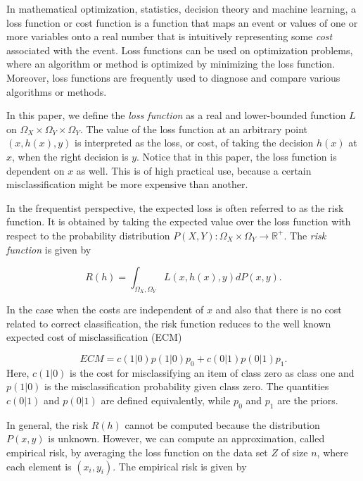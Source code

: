 In mathematical optimization, statistics, decision theory and machine learning, a loss function or cost function is a function that maps an event or values of one or more variables onto a real number that is intuitively representing some \emph{cost} associated with the event. Loss functions can be used on optimization problems, where an algorithm or method is optimized by minimizing the loss function.  Moreover, loss functions are frequently used to diagnose and compare various algorithms or methods.  

In this paper, we define the \emph{loss function} as a real and lower-bounded function $L$ on $\Omega_X \times \Omega_Y \times \Omega_Y$.  The value of the loss function at an arbitrary point $(x, h(x), y)$ is interpreted as the loss, or cost, of taking the decision $h(x)$ at $x$, when the right decision is $y$.  Notice that in this paper, the loss function is dependent on $x$ as well.  This is of high practical use, because a certain misclassification might be more expensive than another. 

In the frequentist perspective, the expected loss is often referred to as the risk function.  It is obtained by taking the expected value over the loss function with respect to the probability distribution $P(X,Y): \Omega_X\times \Omega_Y \rightarrow \mathbb{R}^+$.  The \emph{risk function} is given by

\begin{equation}
\label{def:risk}
R(h) = \int_{\Omega_X,\Omega_Y} L(x,h(x),y) dP(x,y).
\end{equation}

In the case when the costs are independent of $x$ and also that there is no cost related to correct classification, the risk function reduces to the well known expected cost of misclassification (ECM)

\begin{equation}
\label{eq:ecm}
ECM =  c(1|0)p(1|0)p_0  + c(0|1)p(0|1)p_1.
\end{equation}
Here, $c(1|0)$ is the cost for misclassifying an item of class zero as class one and $p(1|0)$ is the misclassification probability given class zero.  The quantities $c(0|1)$ and $p(0|1)$ are defined equivalently, while $p_0$ and $p_1$ are the priors.  

In general, the risk $R(h)$ cannot be computed because the distribution $P(x, y)$ is unknown.  However, we can compute an approximation, called empirical risk, by averaging the loss function on the data set $Z$ of size $n$, where each element is $(x_i, y_i)$.  The empirical risk is given by 

